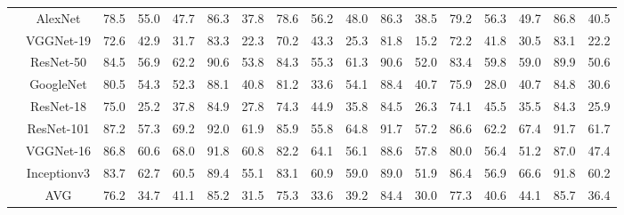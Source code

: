\documentclass[12pt,italian]{article}
\begin{document}
\begin{tiny}
\begin{longtable}{lcccccccccccccccc}
& AlexNet & 78.5 & 55.0 & 47.7 & 86.3 & 37.8 & 78.6 & 56.2 & 48.0 & 86.3 & 38.5 & 79.2 & 56.3 & 49.7 & 86.8 & 40.5 \\ 
& VGGNet-19 & 72.6 & 42.9 & 31.7 & 83.3 & 22.3 & 70.2 & 43.3 & 25.3 & 81.8 & 15.2 & 72.2 & 41.8 & 30.5 & 83.1 & 22.2 \\ 
& ResNet-50 & 84.5 & 56.9 & 62.2 & 90.6 & 53.8 & 84.3 & 55.3 & 61.3 & 90.6 & 52.0 & 83.4 & 59.8 & 59.0 & 89.9 & 50.6 \\ 
& GoogleNet & 80.5 & 54.3 & 52.3 & 88.1 & 40.8 & 81.2 & 33.6 & 54.1 & 88.4 & 40.7 & 75.9 & 28.0 & 40.7 & 84.8 & 30.6 \\ 
& ResNet-18 & 75.0 & 25.2 & 37.8 & 84.9 & 27.8 & 74.3 & 44.9 & 35.8 & 84.5 & 26.3 & 74.1 & 45.5 & 35.5 & 84.3 & 25.9 \\ 
& ResNet-101 & 87.2 & 57.3 & 69.2 & 92.0 & 61.9 & 85.9 & 55.8 & 64.8 & 91.7 & 57.2 & 86.6 & 62.2 & 67.4 & 91.7 & 61.7 \\ 
& VGGNet-16 & 86.8 & 60.6 & 68.0 & 91.8 & 60.8 & 82.2 & 64.1 & 56.1 & 88.6 & 57.8 & 80.0 & 56.4 & 51.2 & 87.0 & 47.4 \\ 
& Inceptionv3 & 83.7 & 62.7 & 60.5 & 89.4 & 55.1 & 83.1 & 60.9 & 59.0 & 89.0 & 51.9 & 86.4 & 56.9 & 66.6 & 91.8 & 60.2 \\ 
\hline
& AVG & 76.2 & 34.7 & 41.1 & 85.2 & 31.5 & 75.3 & 33.6 & 39.2 & 84.4 & 30.0 & 77.3 & 40.6 & 44.1 & 85.7 & 36.4 \\ 
\hline
\bottomrule
\end{longtable} 

 \pagebreak 
\end{tiny} 
 
\end{document}
